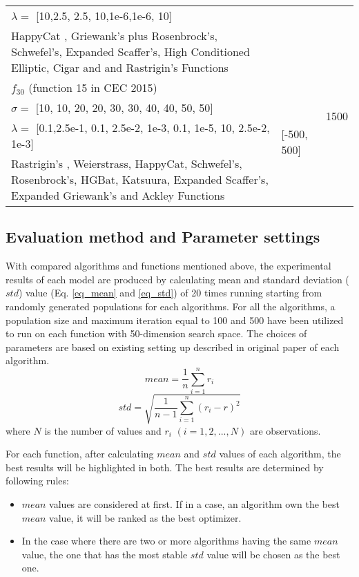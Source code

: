 \documentclass[../main.tex]{subfiles}
\begin{document}
\begin{table}[!t]
\begin{tabular}{p{9cm} p{2cm} p{1cm}}
$\lambda = $  [10,2.5, 2.5, 10,1e-6,1e-6, 10] & \\
HappyCat , Griewank’s plus Rosenbrock’s, Schwefel's, Expanded Scaffer’s, High Conditioned Elliptic, Cigar and  and Rastrigin’s  Functions & \\ \hline
$f_{30}$ (function 15 in CEC 2015) & \multirow{4}{*}{[-500, 500]} & \multirow{3}{*}{1500} \\
$\sigma = $  [10, 10, 20, 20, 30, 30, 40, 40, 50, 50] & \\
$\lambda = $  [0.1,2.5e-1, 0.1, 2.5e-2, 1e-3, 0.1, 1e-5, 10, 2.5e-2, 1e-3] & \\
Rastrigin’s  , Weierstrass, HappyCat, Schwefel's, Rosenbrock's, HGBat, Katsuura, Expanded Scaffer’s, Expanded Griewank’s  and  Ackley  Functions & \\ \hline

\end{tabular}
\end{table}

\subsection{Evaluation method and Parameter settings}

	With compared algorithms and functions mentioned above, the experimental results of each model are produced by calculating mean and standard deviation ($std$) value (Eq. \ref{eq_mean} and \ref{eq_std}) of 20 times running starting from randomly generated populations for each algorithms. For all the algorithms, a population size and maximum iteration equal to 100 and 500 have been utilized to run on each function with 50-dimension search space. The choices  of parameters are based on existing setting up
described in original paper of each algorithm.
\begin{equation} \label{eq_mean}
mean = \frac{1}{n}\sum_{i=1}^n r_i
\end{equation}
\begin{equation}\label{eq_std}
std = \sqrt{\frac{1}{n-1}\sum_{i=1}^n(r_i - r)^2}
\end{equation}
where $N$ is the number of values and $r_i$ $(i = 1, 2, ..., N)$ are observations.
	
	For each function, after calculating $mean$ and $std$ values of each algorithm, the best results will be highlighted in both. The best results are determined by following rules:
\begin{itemize}
\item $mean$ values are considered at first. If in a case, an algorithm own the best $mean$ value, it will be ranked as the best optimizer.
\item In the case where there are two or more algorithms having the same $mean$ value, the one that has the most stable $std$ value will be chosen as the best one.
\end{itemize}
	
\end{document}
